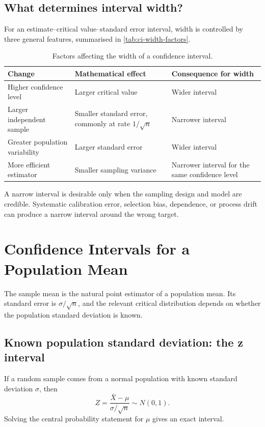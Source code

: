 \subsection{What determines interval width?}

For an estimate--critical value--standard error interval, width is controlled by three general features, summarised in \autoref{tab:ci-width-factors}.

\begin{table}[htbp]
\centering
\caption{Factors affecting the width of a confidence interval.}
\label{tab:ci-width-factors}
\begin{tabularx}{\textwidth}{@{}l>{\raggedright\arraybackslash}X>{\raggedright\arraybackslash}X@{}}
\toprule
Change & Mathematical effect & Consequence for width \\
\midrule
Higher confidence level
& Larger critical value
& Wider interval \\
Larger independent sample
& Smaller standard error, commonly at rate $1/\sqrt n$
& Narrower interval \\
Greater population variability
& Larger standard error
& Wider interval \\
More efficient estimator
& Smaller sampling variance
& Narrower interval for the same confidence level \\
\bottomrule
\end{tabularx}
\end{table}

A narrow interval is desirable only when the sampling design and model are credible. Systematic calibration error, selection bias, dependence, or process drift can produce a narrow interval around the wrong target.

\section{Confidence Intervals for a Population Mean}
\label{sec:confidence-interval-mean}

The sample mean is the natural point estimator of a population mean. Its standard error is $\sigma/\sqrt n$, and the relevant critical distribution depends on whether the population standard deviation is known.

\subsection{Known population standard deviation: the z interval}

If a random sample comes from a normal population with known standard deviation $\sigma$, then
\[
    Z=\frac{\bar X-\mu}{\sigma/\sqrt n}
      \sim N(0,1).
\]
Solving the central probability statement for $\mu$ gives an exact interval.

